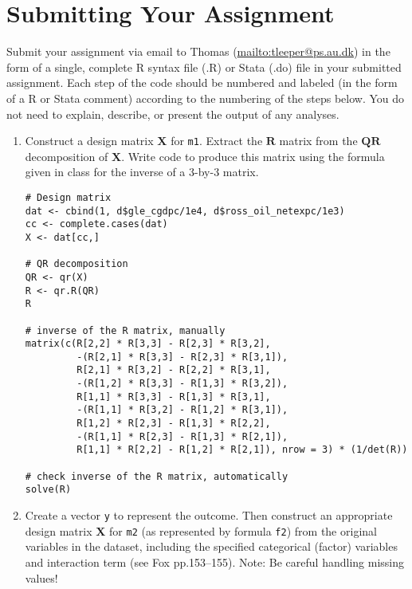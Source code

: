 \documentclass[a4paper,12pt]{article}
\newcommand{\matr}[1]{\mathbf{#1}}
\begin{document}
\section*{Submitting Your Assignment}

\noindent Submit your assignment via email to Thomas (\url{mailto:tleeper@ps.au.dk}) in the form of a single, complete R syntax file (.R) or Stata (.do) file in your submitted assignment. Each step of the code should be numbered and labeled (in the form of a R or Stata comment) according to the numbering of the steps below. You do not need to explain, describe, or present the output of any analyses.


\clearpage

\doublespacing

\begin{enumerate}

\section*{Ordinary Least Squares Regression}

\item Construct a design matrix $\matr{X}$ for \texttt{m1}. Extract the $\matr{R}$ matrix from the $\matr{Q}\matr{R}$ decomposition of $\matr{X}$. Write code to produce this matrix using the formula given in class for the inverse of a 3-by-3 matrix.

\begin{solution}
\begin{lstlisting}
# Design matrix
dat <- cbind(1, d$gle_cgdpc/1e4, d$ross_oil_netexpc/1e3)
cc <- complete.cases(dat)
X <- dat[cc,]

# QR decomposition
QR <- qr(X)
R <- qr.R(QR)
R

# inverse of the R matrix, manually
matrix(c(R[2,2] * R[3,3] - R[2,3] * R[3,2],
         -(R[2,1] * R[3,3] - R[2,3] * R[3,1]),
         R[2,1] * R[3,2] - R[2,2] * R[3,1],
         -(R[1,2] * R[3,3] - R[1,3] * R[3,2]),
         R[1,1] * R[3,3] - R[1,3] * R[3,1],
         -(R[1,1] * R[3,2] - R[1,2] * R[3,1]),
         R[1,2] * R[2,3] - R[1,3] * R[2,2],
         -(R[1,1] * R[2,3] - R[1,3] * R[2,1]),
         R[1,1] * R[2,2] - R[1,2] * R[2,1]), nrow = 3) * (1/det(R))

# check inverse of the R matrix, automatically
solve(R)
\end{lstlisting}
\end{solution}

\item Create a vector \texttt{y} to represent the outcome. Then construct an appropriate design matrix $\matr{X}$ for \texttt{m2} (as represented by formula \texttt{f2}) from the original variables in the dataset, including the specified categorical (factor) variables and interaction term (see Fox pp.153--155). Note: Be careful handling missing values!


\end{enumerate}
\end{document}
